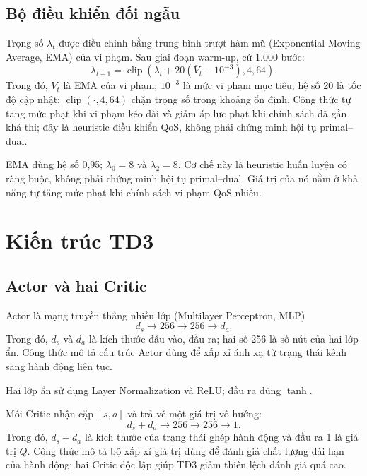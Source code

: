 \subsection{Bộ điều khiển đối ngẫu}
Trọng số $\lambda_t$ được điều chỉnh bằng trung bình trượt hàm mũ (Exponential Moving Average, EMA) của vi phạm. Sau giai đoạn warm-up, cứ 1.000 bước:
\begin{equation}
 \lambda_{t+1}=\operatorname{clip}
 \left(\lambda_t+20(\overline V_t-10^{-3}),4,64\right).
 \label{eq:dual-update-ch3}
\end{equation}
Trong đó, $\overline V_t$ là EMA của vi phạm; $10^{-3}$ là mức vi phạm mục tiêu; hệ số 20 là tốc độ cập nhật; $\operatorname{clip}(\cdot,4,64)$ chặn trọng số trong khoảng ổn định. Công thức tự tăng mức phạt khi vi phạm kéo dài và giảm áp lực phạt khi chính sách đã gần khả thi; đây là heuristic điều khiển QoS, không phải chứng minh hội tụ primal--dual.

EMA dùng hệ số 0,95; $\lambda_0=8$ và $\lambda_2=8$. Cơ chế này là heuristic huấn luyện có ràng buộc, không phải chứng minh hội tụ primal--dual. Giá trị của nó nằm ở khả năng tự tăng mức phạt khi chính sách vi phạm QoS nhiều.

\section{Kiến trúc TD3}
\subsection{Actor và hai Critic}
Actor là mạng truyền thẳng nhiều lớp (Multilayer Perceptron, MLP)
\begin{equation}
 d_s\rightarrow256\rightarrow256\rightarrow d_a.
\end{equation}
Trong đó, $d_s$ và $d_a$ là kích thước đầu vào, đầu ra; hai số 256 là số nút của hai lớp ẩn. Công thức mô tả cấu trúc Actor dùng để xấp xỉ ánh xạ từ trạng thái kênh sang hành động liên tục.

Hai lớp ẩn sử dụng Layer Normalization và ReLU; đầu ra dùng $\tanh$.

Mỗi Critic nhận cặp $[s,a]$ và trả về một giá trị vô hướng:
\begin{equation}
 d_s+d_a\rightarrow256\rightarrow256\rightarrow1.
\end{equation}
Trong đó, $d_s+d_a$ là kích thước của trạng thái ghép hành động và đầu ra 1 là giá trị $Q$. Công thức mô tả bộ xấp xỉ giá trị dùng để đánh giá chất lượng dài hạn của hành động; hai Critic độc lập giúp TD3 giảm thiên lệch đánh giá quá cao.

